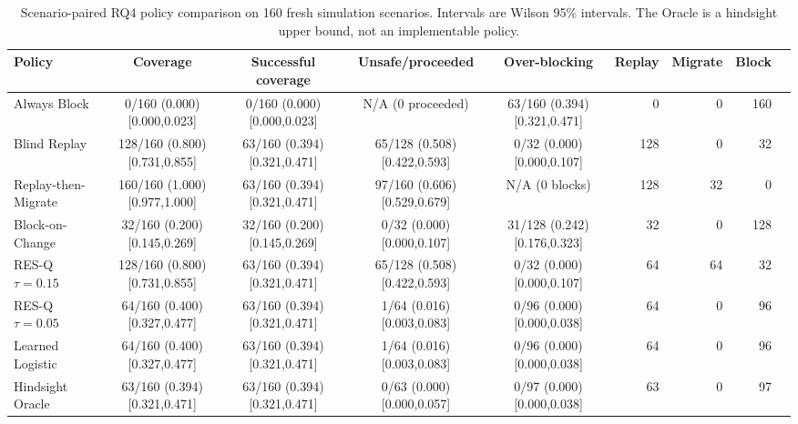 \begin{table}[t]
\centering
\small
\begin{tabular}{@{}lccccrrrr@{}}
\toprule
Policy & Coverage & Successful coverage & Unsafe/proceeded & Over-blocking & Replay & Migrate & Block \\
\midrule
Always Block & 0/160 (0.000) [0.000,0.023] & 0/160 (0.000) [0.000,0.023] & N/A (0 proceeded) & 63/160 (0.394) [0.321,0.471] & 0 & 0 & 160 \\
Blind Replay & 128/160 (0.800) [0.731,0.855] & 63/160 (0.394) [0.321,0.471] & 65/128 (0.508) [0.422,0.593] & 0/32 (0.000) [0.000,0.107] & 128 & 0 & 32 \\
Replay-then-Migrate & 160/160 (1.000) [0.977,1.000] & 63/160 (0.394) [0.321,0.471] & 97/160 (0.606) [0.529,0.679] & N/A (0 blocks) & 128 & 32 & 0 \\
Block-on-Change & 32/160 (0.200) [0.145,0.269] & 32/160 (0.200) [0.145,0.269] & 0/32 (0.000) [0.000,0.107] & 31/128 (0.242) [0.176,0.323] & 32 & 0 & 128 \\
RES-Q $\tau=0.15$ & 128/160 (0.800) [0.731,0.855] & 63/160 (0.394) [0.321,0.471] & 65/128 (0.508) [0.422,0.593] & 0/32 (0.000) [0.000,0.107] & 64 & 64 & 32 \\
RES-Q $\tau=0.05$ & 64/160 (0.400) [0.327,0.477] & 63/160 (0.394) [0.321,0.471] & 1/64 (0.016) [0.003,0.083] & 0/96 (0.000) [0.000,0.038] & 64 & 0 & 96 \\
Learned Logistic & 64/160 (0.400) [0.327,0.477] & 63/160 (0.394) [0.321,0.471] & 1/64 (0.016) [0.003,0.083] & 0/96 (0.000) [0.000,0.038] & 64 & 0 & 96 \\
Hindsight Oracle & 63/160 (0.394) [0.321,0.471] & 63/160 (0.394) [0.321,0.471] & 0/63 (0.000) [0.000,0.057] & 0/97 (0.000) [0.000,0.038] & 63 & 0 & 97 \\
\bottomrule
\end{tabular}
\caption{Scenario-paired RQ4 policy comparison on 160 fresh simulation scenarios. Intervals are Wilson 95\% intervals. The Oracle is a hindsight upper bound, not an implementable policy.}
\label{tab:rq4-policy-comparison}
\end{table}
